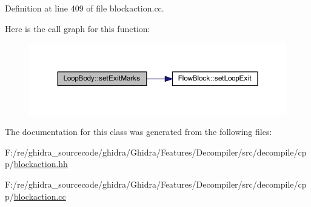 Definition at line 409 of file blockaction.\+cc.

Here is the call graph for this function\+:
\nopagebreak
\begin{figure}[H]
\begin{center}
\leavevmode
\includegraphics[width=350pt]{class_loop_body_a24f6fd993c0e4fe0684f9fa4446e9e9c_cgraph}
\end{center}
\end{figure}


The documentation for this class was generated from the following files\+:\begin{DoxyCompactItemize}
\item 
F\+:/re/ghidra\+\_\+sourcecode/ghidra/\+Ghidra/\+Features/\+Decompiler/src/decompile/cpp/\mbox{\hyperlink{blockaction_8hh}{blockaction.\+hh}}\item 
F\+:/re/ghidra\+\_\+sourcecode/ghidra/\+Ghidra/\+Features/\+Decompiler/src/decompile/cpp/\mbox{\hyperlink{blockaction_8cc}{blockaction.\+cc}}\end{DoxyCompactItemize}
